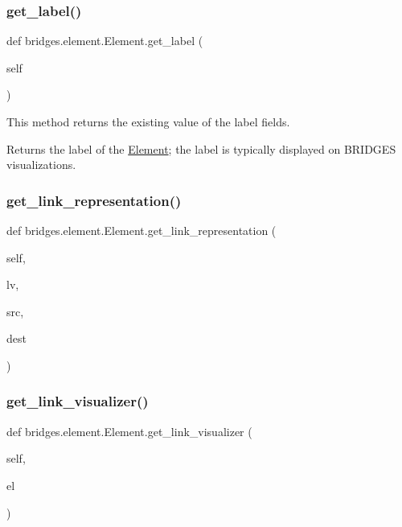 \subsubsection{\texorpdfstring{get\+\_\+label()}{get\_label()}}
{\footnotesize\ttfamily def bridges.\+element.\+Element.\+get\+\_\+label (\begin{DoxyParamCaption}\item[{}]{self }\end{DoxyParamCaption})}



This method returns the existing value of the label fields. 

\begin{DoxyReturn}{Returns}
the label of the \mbox{\hyperlink{classbridges_1_1element_1_1_element}{Element}}; the label is typically displayed on B\+R\+I\+D\+G\+ES visualizations. 
\end{DoxyReturn}
\mbox{\label{classbridges_1_1element_1_1_element_a8f220d7b81c0e0dd84b9eff33ade76b9}} 
\subsubsection{\texorpdfstring{get\+\_\+link\+\_\+representation()}{get\_link\_representation()}}
{\footnotesize\ttfamily def bridges.\+element.\+Element.\+get\+\_\+link\+\_\+representation (\begin{DoxyParamCaption}\item[{}]{self,  }\item[{}]{lv,  }\item[{}]{src,  }\item[{}]{dest }\end{DoxyParamCaption})}

\mbox{\label{classbridges_1_1element_1_1_element_af04537af8ad9f64047de96a524c8c1f9}} 
\subsubsection{\texorpdfstring{get\+\_\+link\+\_\+visualizer()}{get\_link\_visualizer()}}
{\footnotesize\ttfamily def bridges.\+element.\+Element.\+get\+\_\+link\+\_\+visualizer (\begin{DoxyParamCaption}\item[{}]{self,  }\item[{}]{el }\end{DoxyParamCaption})}



